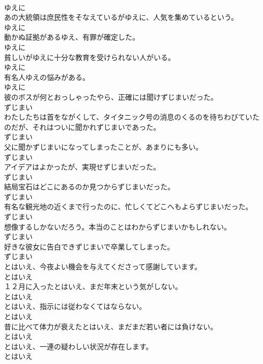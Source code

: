 \documentclass[8pt]{extreport}
\begin{document}
\begin{CJK}{UTF8}{min}
\\	ゆえに
\\	あの大統領は庶民性をそなえているがゆえに、人気を集めているという。	
\\	ゆえに
\\	動かぬ証拠があるゆえ、有罪が確定した。	
\\	ゆえに
\\	貧しいがゆえに十分な教育を受けられない人がいる。	
\\	ゆえに
\\	有名人ゆえの悩みがある。	
\\	ゆえに
\\	彼のボスが何とおっしゃったやら、正確には聞けずじまいだった。	
\\	ずじまい
\\	わたしたちは首をながくして、タイタニック号の消息のくるのを待ちわびていたのだが、それはついに聞かれずじまいであった。	
\\	ずじまい
\\	父に聞かずじまいになってしまったことが、あまりにも多い。	
\\	ずじまい
\\	アイデアはよかったが、実現せずじまいだった。	
\\	ずじまい
\\	結局宝石はどこにあるのか見つからずじまいだった。	
\\	ずじまい
\\	有名な観光地の近くまで行ったのに、忙しくてどこへもよらずじまいだった。	
\\	ずじまい
\\	想像するしかないだろう。本当のことはわからずじまいかもしれない。	
\\	ずじまい
\\	好きな彼女に告白できずじまいで卒業してしまった。	
\\	ずじまい
\\	とはいえ、今夜よい機会を与えてくださって感謝しています。	
\\	とはいえ
\\	１２月に入ったとはいえ、まだ年末という気がしない。	
\\	とはいえ
\\	とはいえ、指示には従わなくてはならない。	
\\	とはいえ
\\	昔に比べて体力が衰えたとはいえ、まだまだ若い者には負けない。	
\\	とはいえ
\\	とはいえ、一連の疑わしい状況が存在します。	
\\	とはいえ

\end{CJK}
\end{document}
